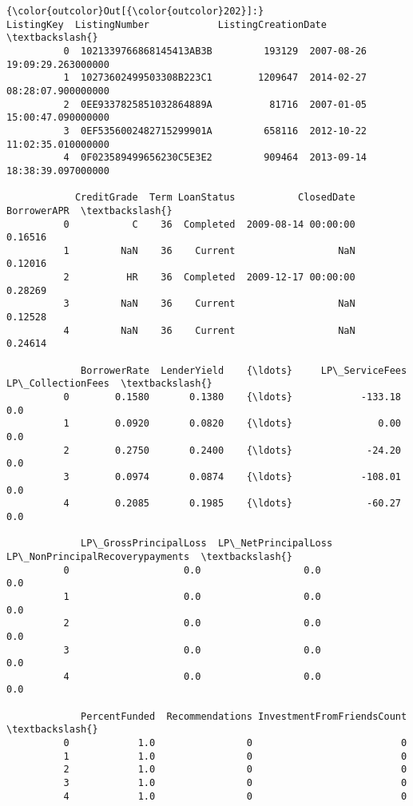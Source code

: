 \documentclass[11pt]{article}
\begin{document}
\begin{Verbatim}[commandchars=\\\{\}]
{\color{outcolor}Out[{\color{outcolor}202}]:}                 ListingKey  ListingNumber            ListingCreationDate  \textbackslash{}
          0  1021339766868145413AB3B         193129  2007-08-26 19:09:29.263000000   
          1  10273602499503308B223C1        1209647  2014-02-27 08:28:07.900000000   
          2  0EE9337825851032864889A          81716  2007-01-05 15:00:47.090000000   
          3  0EF5356002482715299901A         658116  2012-10-22 11:02:35.010000000   
          4  0F023589499656230C5E3E2         909464  2013-09-14 18:38:39.097000000   
          
            CreditGrade  Term LoanStatus           ClosedDate  BorrowerAPR  \textbackslash{}
          0           C    36  Completed  2009-08-14 00:00:00      0.16516   
          1         NaN    36    Current                  NaN      0.12016   
          2          HR    36  Completed  2009-12-17 00:00:00      0.28269   
          3         NaN    36    Current                  NaN      0.12528   
          4         NaN    36    Current                  NaN      0.24614   
          
             BorrowerRate  LenderYield    {\ldots}     LP\_ServiceFees  LP\_CollectionFees  \textbackslash{}
          0        0.1580       0.1380    {\ldots}            -133.18                0.0   
          1        0.0920       0.0820    {\ldots}               0.00                0.0   
          2        0.2750       0.2400    {\ldots}             -24.20                0.0   
          3        0.0974       0.0874    {\ldots}            -108.01                0.0   
          4        0.2085       0.1985    {\ldots}             -60.27                0.0   
          
             LP\_GrossPrincipalLoss  LP\_NetPrincipalLoss LP\_NonPrincipalRecoverypayments  \textbackslash{}
          0                    0.0                  0.0                             0.0   
          1                    0.0                  0.0                             0.0   
          2                    0.0                  0.0                             0.0   
          3                    0.0                  0.0                             0.0   
          4                    0.0                  0.0                             0.0   
          
             PercentFunded  Recommendations InvestmentFromFriendsCount  \textbackslash{}
          0            1.0                0                          0   
          1            1.0                0                          0   
          2            1.0                0                          0   
          3            1.0                0                          0   
          4            1.0                0                          0   
          

\end{Verbatim}
\end{document}
